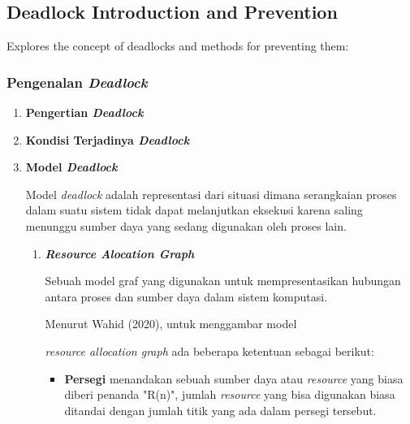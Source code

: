 \documentclass[12pt]{article}
\begin{document}
\subsection{Deadlock Introduction and Prevention}
Explores the concept of deadlocks and methods for preventing them:
\begin{itemize}
    \subsubsection{Pengenalan \textit{Deadlock}}
        \begin{enumerate}
            \item \textbf{Pengertian \textit{Deadlock}}
            \item \textbf{Kondisi Terjadinya \textit{Deadlock}}
            \item \textbf{Model \textit{Deadlock}}

                \hspace{1cm}
                Model \textit{deadlock} adalah representasi dari situasi dimana serangkaian proses dalam suatu sistem tidak dapat melanjutkan eksekusi karena saling menunggu sumber daya yang sedang digunakan oleh proses lain.\newline
                
                \begin{enumerate}
                    \item \textit{\textbf{Resource Alocation Graph}}

                        \hspace{1cm}
                        Sebuah model graf yang digunakan untuk mempresentasikan hubungan antara proses dan sumber daya dalam sistem komputasi.

                        \hspace{1cm}
                        Menurut Wahid (2020), untuk menggambar model 
                        
                        \textit{resource allocation graph} ada beberapa ketentuan sebagai berikut:
                        
                        \begin{itemize}
                            \item \textbf{Persegi} menandakan sebuah sumber daya atau \textit{resource} yang biasa diberi penanda "R(n)", jumlah \textit{resource} yang bisa digunakan biasa ditandai dengan jumlah titik yang ada dalam persegi tersebut.
                            

\end{itemize}
\end{enumerate}
\end{enumerate}
\end{itemize}
\end{document}
